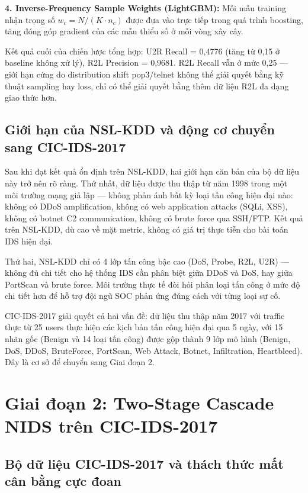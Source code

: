 \documentclass[../DoAn.tex]{subfiles}
\begin{document}
\textbf{4. Inverse-Frequency Sample Weights (LightGBM):} Mỗi mẫu training nhận trọng số $w_c = N / (K \cdot n_c)$ được đưa vào trực tiếp trong quá trình boosting, tăng đóng góp gradient của các mẫu thiểu số ở mỗi vòng xây cây.

Kết quả cuối của chiến lược tổng hợp: U2R Recall = 0,4776 (tăng từ 0,15 ở baseline không xử lý), R2L Precision = 0,9681. R2L Recall vẫn ở mức 0,25 --- giới hạn cứng do distribution shift pop3/telnet không thể giải quyết bằng kỹ thuật sampling hay loss, chỉ có thể giải quyết bằng thêm dữ liệu R2L đa dạng giao thức hơn.

\subsection{Giới hạn của NSL-KDD và động cơ chuyển sang CIC-IDS-2017}
\label{subsec:gd1-limit}

Sau khi đạt kết quả ổn định trên NSL-KDD, hai giới hạn căn bản của bộ dữ liệu này trở nên rõ ràng. Thứ nhất, dữ liệu được thu thập từ năm 1998 trong một môi trường mạng giả lập --- không phản ánh bất kỳ loại tấn công hiện đại nào: không có DDoS amplification, không có web application attacks (SQLi, XSS), không có botnet C2 communication, không có brute force qua SSH/FTP. Kết quả trên NSL-KDD, dù cao về mặt metric, không có giá trị thực tiễn cho bài toán IDS hiện đại.

Thứ hai, NSL-KDD chỉ có 4 lớp tấn công bậc cao (DoS, Probe, R2L, U2R) --- không đủ chi tiết cho hệ thống IDS cần phân biệt giữa DDoS và DoS, hay giữa PortScan và brute force. Môi trường thực tế đòi hỏi phân loại tấn công ở mức độ chi tiết hơn để hỗ trợ đội ngũ SOC phản ứng đúng cách với từng loại sự cố.

CIC-IDS-2017 \cite{sharafaldin2018} giải quyết cả hai vấn đề: dữ liệu thu thập năm 2017 với traffic thực từ 25 users thực hiện các kịch bản tấn công hiện đại qua 5 ngày, với 15 nhãn gốc (Benign và 14 loại tấn công) được gộp thành 9 lớp mô hình (Benign, DoS, DDoS, BruteForce, PortScan, Web Attack, Botnet, Infiltration, Heartbleed). Đây là cơ sở để chuyển sang Giai đoạn 2.

\section{Giai đoạn 2: Two-Stage Cascade NIDS trên CIC-IDS-2017}
\label{sec:gd2}

\subsection{Bộ dữ liệu CIC-IDS-2017 và thách thức mất cân bằng cực đoan}
\label{subsec:gd2-data}
\end{document}

